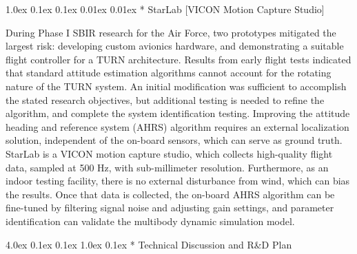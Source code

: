 \documentclass[11pt]{article}
\makeatletter
\renewcommand\section{
\@startsection{section}{1}{\z@}%
{4.0ex \@plus 0.1ex \@minus 0.1ex}%
{1.0ex \@plus 0.1ex}%
{\normalfont\LARGE\bfseries}}
\renewcommand\subsection{
\@startsection{subsection}{2}{\z@}%
{1.0ex \@plus 0.1ex \@minus 0.1ex}%
{0.01ex \@plus 0.01ex}%
{\normalfont\Large\bfseries}}
\makeatother
\begin{document}
\subsection*{\color{green} StarLab [VICON Motion Capture Studio]}

During Phase I SBIR research for the Air Force, two prototypes mitigated the largest risk: developing custom avionics hardware, and demonstrating a suitable flight controller for a TURN architecture.  Results from early flight tests indicated that standard attitude estimation algorithms cannot account for the rotating nature of the TURN system.  An initial modification was sufficient to accomplish the stated research objectives, but additional testing is needed to refine the algorithm, and complete the system identification testing.  Improving the attitude heading and reference system (AHRS) algorithm requires an external localization solution, independent of the on-board sensors, which can serve as ground truth.  StarLab is a VICON motion capture studio, which collects high-quality flight data, sampled at 500 Hz, with sub-millimeter resolution.  Furthermore, as an indoor testing facility, there is no external disturbance from wind, which can bias the results.  Once that data is collected, the on-board AHRS algorithm can be fine-tuned by filtering signal noise and adjusting gain settings, and parameter identification can validate the multibody dynamic simulation model.








\section*{\color{green} Technical Discussion and R\&D Plan}  %
\end{document}
